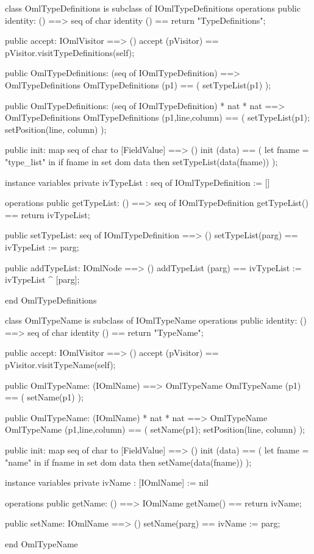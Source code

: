 \begin{vdm_al}
class OmlTypeDefinitions is subclass of IOmlTypeDefinitions
operations
  public identity: () ==> seq of char
  identity () == return "TypeDefinitions";

  public accept: IOmlVisitor ==> ()
  accept (pVisitor) == pVisitor.visitTypeDefinitions(self);

  public OmlTypeDefinitions:
    (seq of IOmlTypeDefinition) ==> OmlTypeDefinitions
  OmlTypeDefinitions (p1) == 
    ( setTypeList(p1) );

  public OmlTypeDefinitions:
    (seq of IOmlTypeDefinition) *
    nat *
    nat ==> OmlTypeDefinitions
  OmlTypeDefinitions (p1,line,column) == 
    ( setTypeList(p1);
      setPosition(line, column) );

  public init: map seq of char to [FieldValue] ==> ()
  init (data) ==
    ( let fname = "type_list" in
        if fname in set dom data
        then setTypeList(data(fname)) );

instance variables
  private ivTypeList : seq of IOmlTypeDefinition := []

operations
  public getTypeList: () ==> seq of IOmlTypeDefinition
  getTypeList() == return ivTypeList;

  public setTypeList: seq of IOmlTypeDefinition ==> ()
  setTypeList(parg) == ivTypeList := parg;

  public addTypeList: IOmlNode ==> ()
  addTypeList (parg) == ivTypeList := ivTypeList ^ [parg];

end OmlTypeDefinitions
\end{vdm_al}

\begin{vdm_al}
class OmlTypeName is subclass of IOmlTypeName
operations
  public identity: () ==> seq of char
  identity () == return "TypeName";

  public accept: IOmlVisitor ==> ()
  accept (pVisitor) == pVisitor.visitTypeName(self);

  public OmlTypeName:
    (IOmlName) ==> OmlTypeName
  OmlTypeName (p1) == 
    ( setName(p1) );

  public OmlTypeName:
    (IOmlName) *
    nat *
    nat ==> OmlTypeName
  OmlTypeName (p1,line,column) == 
    ( setName(p1);
      setPosition(line, column) );

  public init: map seq of char to [FieldValue] ==> ()
  init (data) ==
    ( let fname = "name" in
        if fname in set dom data
        then setName(data(fname)) );

instance variables
  private ivName : [IOmlName] := nil

operations
  public getName: () ==> IOmlName
  getName() == return ivName;

  public setName: IOmlName ==> ()
  setName(parg) == ivName := parg;

end OmlTypeName
\end{vdm_al}

